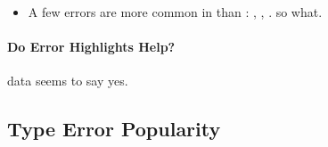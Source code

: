 \documentclass[english,submission,cleveref]{programming}
\begin{document}
\begin{itemize}
  \item
    A few errors are more common in \mstrict{} than \mnonstrict{}:
    ,
    ,
    .
    \FILL{} so what.

\end{itemize}


\paragraph{Do Error Highlights Help?}

\FILL{} data seems to say yes.


\subsection{Type Error Popularity}
\label{s:type-error-count}
\end{document}
